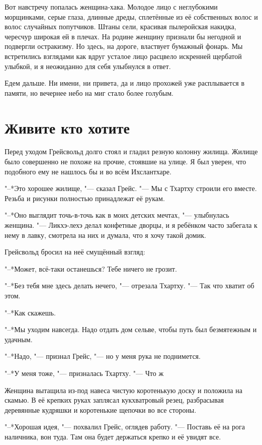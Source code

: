 \documentclass[a4paper,10pt]{book}
\newcommand{\ldotst}{\so{...}\xspace}
\begin{document}
Вот навстречу попалась женщина-хака. Молодое лицо с неглубокими морщинками, серые глаза, длинные дреды, сплетённые из её собственных волос и волос случайных попутчиков. Штаны сели, красивая пылеройская накидка, чересчур широкая ей в плечах. На родине женщину признали бы негодной и подвергли остракизму. Но здесь, на дороге, властвует бумажный фонарь. Мы встретились взглядами\ldotst как вдруг усталое лицо расцвело искренней щербатой улыбкой, и я неожиданно для себя улыбнулся в ответ.

Едем дальше. Ни имени, ни привета, да и лицо прохожей уже расплывается в памяти, но вечернее небо на миг стало более голубым.
 
\section{Живите кто хотите}

 Перед уходом Грейсвольд долго стоял и гладил резную колонну жилища. Жилище было совершенно не похоже на прочие, стоявшие на улице. Я был уверен, что подобного ему не нашлось бы и во всём Ихслантхаре.

"--*Это хорошее жилище, "--- сказал Грейс. "--- Мы с Тхартху строили его вместе. Резьба и рисунки полностью принадлежат её рукам.

"--*Оно выглядит точь-в-точь как в моих детских мечтах, "--- улыбнулась женщина. "--- Ликхэ-лехэ делал конфетные дворцы, и я ребёнком часто забегала к нему в лавку, смотрела на них и думала, что я хочу такой домик.

Грейсвольд бросил на неё смущённый взгляд:

"--*Может, всё-таки останешься? Тебе ничего не грозит.

"--*Без тебя мне здесь делать нечего, "--- отрезала Тхартху. "--- Так что хватит об этом.

"--*Как скажешь.

"--*Мы уходим навсегда. Надо отдать дом сельве, чтобы путь был безмятежным и удачным.

"--*Надо, "--- признал Грейс, "--- но у меня рука не поднимется.

"--*У меня тоже, "--- призналась Тхартху. "--- Что ж\ldotst

Женщина вытащила из-под навеса чистую коротенькую доску и положила на скамью. В её крепких руках заплясал кукхватровый резец, разбрасывая деревянные кудряшки и коротенькие щепочки во все стороны.

"--*Хорошая идея, "--- похвалил Грейс, оглядев работу. "--- Поставь её на рога наличника, вон туда. Там она будет держаться крепко и её увидят все.
\end{document}

